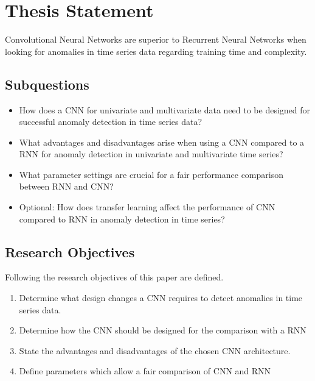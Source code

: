 
\section{Thesis Statement} \label{thesisstatement}

Convolutional Neural Networks are superior to Recurrent Neural Networks when looking for anomalies in time series data regarding training time and complexity.

\subsection{Subquestions}

\begin{itemize}
	\item How does a CNN for univariate and multivariate data need to be designed for successful anomaly detection in time series data?
	\item What advantages and disadvantages arise when using a CNN compared to a RNN for anomaly detection in univariate and multivariate time series?
	\item What parameter settings are crucial for a fair performance comparison between RNN and CNN? 
	\item Optional: How does transfer learning affect the performance of CNN compared to RNN in anomaly detection in time series?
\end{itemize}

 
\subsection{Research Objectives}

Following the research objectives of this paper are defined.


\begin{enumerate}
	\item Determine what design changes a CNN requires to detect anomalies in time series data.
	\item Determine how the CNN should be designed for the comparison with a RNN
	\item State the advantages and disadvantages of the chosen CNN architecture.
	\item Define parameters which allow a fair comparison of CNN and RNN
\end{enumerate}

